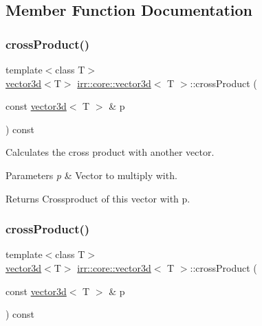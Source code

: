 \subsection{Member Function Documentation}
\mbox{\label{classirr_1_1core_1_1vector3d_a868da2be92d9b5c05858a17bc580ddd6}} 
\subsubsection{\texorpdfstring{cross\+Product()}{crossProduct()}\hspace{0.1cm}{\footnotesize\ttfamily [1/2]}}
{\footnotesize\ttfamily template$<$class T$>$ \\
\hyperlink{classirr_1_1core_1_1vector3d}{vector3d}$<$T$>$ \hyperlink{classirr_1_1core_1_1vector3d}{irr\+::core\+::vector3d}$<$ T $>$\+::cross\+Product (\begin{DoxyParamCaption}\item[{const \hyperlink{classirr_1_1core_1_1vector3d}{vector3d}$<$ T $>$ \&}]{p }\end{DoxyParamCaption}) const\hspace{0.3cm}{\ttfamily [inline]}}



Calculates the cross product with another vector. 


\begin{DoxyParams}{Parameters}
{\em p} & Vector to multiply with. \\
\hline
\end{DoxyParams}
\begin{DoxyReturn}{Returns}
Crossproduct of this vector with p. 
\end{DoxyReturn}
\mbox{\label{classirr_1_1core_1_1vector3d_a868da2be92d9b5c05858a17bc580ddd6}} 
\subsubsection{\texorpdfstring{cross\+Product()}{crossProduct()}\hspace{0.1cm}{\footnotesize\ttfamily [2/2]}}
{\footnotesize\ttfamily template$<$class T$>$ \\
\hyperlink{classirr_1_1core_1_1vector3d}{vector3d}$<$T$>$ \hyperlink{classirr_1_1core_1_1vector3d}{irr\+::core\+::vector3d}$<$ T $>$\+::cross\+Product (\begin{DoxyParamCaption}\item[{const \hyperlink{classirr_1_1core_1_1vector3d}{vector3d}$<$ T $>$ \&}]{p }\end{DoxyParamCaption}) const\hspace{0.3cm}{\ttfamily [inline]}}




